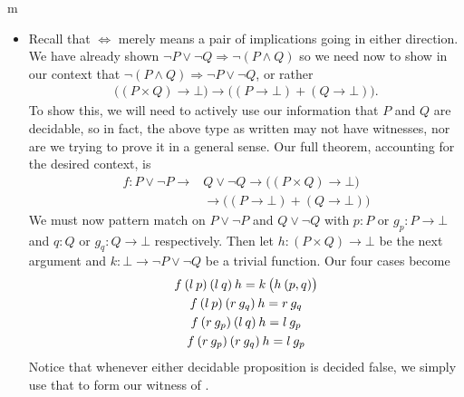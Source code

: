 \documentclass[11pt]{article}
\begin{document}
\begin{my proof}{m}
\begin{itemize}
\item Recall that $\Leftrightarrow$ merely means a pair of implications going in either direction. We have already shown $\neg P \vee \neg Q \Rightarrow \neg (P \wedge Q)$ so we need now to show in our context that $\neg (P \wedge Q) \Rightarrow \neg P \vee \neg Q$, or rather \begin{gather*}
\big((P \times Q) \to \bot \big) \to \big( (P \to \bot) + (Q \to \bot) \big).
\end{gather*}
To show this, we will need to actively use our information that $P$ and $Q$ are decidable, so in fact, the above type as written may not have witnesses, nor are we trying to prove it in a general sense. Our full theorem, accounting for the desired context, is \begin{align*}
f \colon P \vee \neg P \to & Q \vee \neg Q \to \big((P \times Q) \to \bot \big) \\
& \to \big( (P \to \bot) + (Q \to \bot) \big)
\end{align*}
We must now pattern match on $P \vee \neg P$ and $Q \vee \neg Q$ with $p \colon P$ or $g_p \colon P \to \bot$ and $q \colon Q$ or $g_q \colon Q \to \bot$ respectively. Then let $h \colon (P \times Q) \to \bot$ be the next argument and $k \colon \bot \to \neg P \vee \neg Q$ be a trivial function. Our four cases become \begin{gather*}
f \hspace{0.2em} (l \hspace{0.2em} p) \hspace{0.2em} (l \hspace{0.2em} q) \hspace{0.2em} h = k \hspace{0.2em} \big(h \hspace{0.2em} (p,q) \big) \\
f \hspace{0.2em} (l \hspace{0.2em} p) \hspace{0.2em} (r \hspace{0.2em} g_q) \hspace{0.2em} h = r \hspace{0.2em} g_q \\
f \hspace{0.2em} (r \hspace{0.2em} g_p) \hspace{0.2em} (l \hspace{0.2em} q) \hspace{0.2em} h = l \hspace{0.2em} g_p \\
f \hspace{0.2em} (r \hspace{0.2em} g_p) \hspace{0.2em} (r \hspace{0.2em} g_q) \hspace{0.2em} h = l \hspace{0.2em} g_p
\end{gather*}
Notice that whenever either decidable proposition is decided false, we simply use that to form our witness of .



\end{itemize}
\end{my proof}
\end{document}
